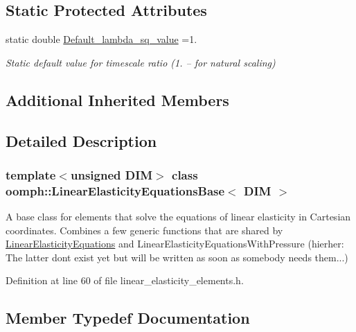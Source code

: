 \subsection*{Static Protected Attributes}
\begin{DoxyCompactItemize}
\item 
static double \hyperlink{classoomph_1_1LinearElasticityEquationsBase_a1e211e506e98ab5f1b0276d0746f4985}{Default\+\_\+lambda\+\_\+sq\+\_\+value} =1.
\begin{DoxyCompactList}\small\item\em Static default value for timescale ratio (1. -- for natural scaling) \end{DoxyCompactList}\end{DoxyCompactItemize}
\subsection*{Additional Inherited Members}


\subsection{Detailed Description}
\subsubsection*{template$<$unsigned D\+IM$>$\newline
class oomph\+::\+Linear\+Elasticity\+Equations\+Base$<$ D\+I\+M $>$}

A base class for elements that solve the equations of linear elasticity in Cartesian coordinates. Combines a few generic functions that are shared by \hyperlink{classoomph_1_1LinearElasticityEquations}{Linear\+Elasticity\+Equations} and Linear\+Elasticity\+Equations\+With\+Pressure (hierher\+: The latter don\textquotesingle{}t exist yet but will be written as soon as somebody needs them...) 

Definition at line 60 of file linear\+\_\+elasticity\+\_\+elements.\+h.



\subsection{Member Typedef Documentation}
\mbox{\label{classoomph_1_1LinearElasticityEquationsBase_ada2fc7aa2569c35e28982f93a0749903}} 
